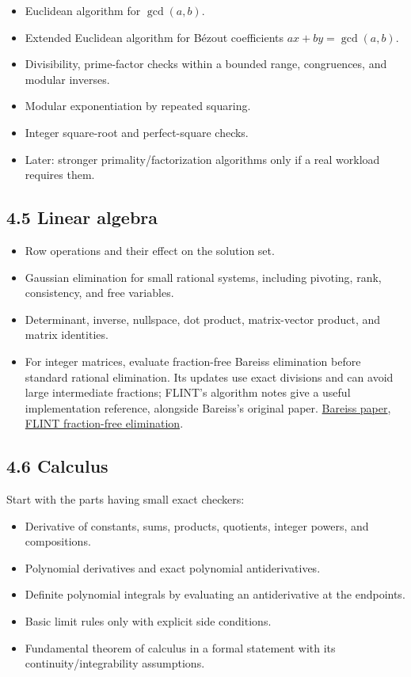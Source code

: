 \documentclass[
  10pt,
]{article}
\providecommand{\tightlist}{%
  \setlength{\itemsep}{0pt}\setlength{\parskip}{0pt}}
\begin{document}
\begin{itemize}
\tightlist
\item
  Euclidean algorithm for \(\gcd(a,b)\).
\item
  Extended Euclidean algorithm for Bézout coefficients
  \(ax+by=\gcd(a,b)\).
\item
  Divisibility, prime-factor checks within a bounded range, congruences,
  and modular inverses.
\item
  Modular exponentiation by repeated squaring.
\item
  Integer square-root and perfect-square checks.
\item
  Later: stronger primality/factorization algorithms only if a real
  workload requires them.
\end{itemize}

\subsection{4.5 Linear algebra}\label{linear-algebra}

\begin{itemize}
\tightlist
\item
  Row operations and their effect on the solution set.
\item
  Gaussian elimination for small rational systems, including pivoting,
  rank, consistency, and free variables.
\item
  Determinant, inverse, nullspace, dot product, matrix-vector product,
  and matrix identities.
\item
  For integer matrices, evaluate fraction-free Bareiss elimination
  before standard rational elimination. Its updates use exact divisions
  and can avoid large intermediate fractions; FLINT's algorithm notes
  give a useful implementation reference, alongside Bareiss's original
  paper.
  \href{https://doi.org/10.1090/S0025-5718-1968-0226829-0}{Bareiss
  paper},
  \href{https://flintlib.org/doc/algorithms/linear-algebra/fraction-free.html}{FLINT
  fraction-free elimination}.
\end{itemize}

\subsection{4.6 Calculus}\label{calculus}

Start with the parts having small exact checkers:

\begin{itemize}
\tightlist
\item
  Derivative of constants, sums, products, quotients, integer powers,
  and compositions.
\item
  Polynomial derivatives and exact polynomial antiderivatives.
\item
  Definite polynomial integrals by evaluating an antiderivative at the
  endpoints.
\item
  Basic limit rules only with explicit side conditions.
\item
  Fundamental theorem of calculus in a formal statement with its
  continuity/integrability assumptions.
\end{itemize}
\end{document}
